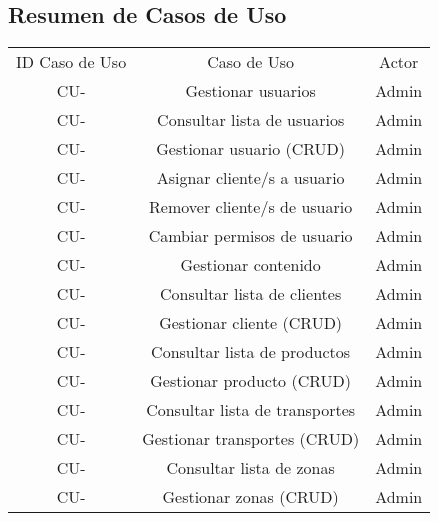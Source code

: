     \subsection{Resumen de Casos de Uso}
    \newcommand\rownumber{\stepcounter{magicrownumbers}\arabic{magicrownumbers}}
    \begin{center}
        \begin{longtable}{ |c|c|c| }
            \hline
            \rowcolor{lightgray}
            ID Caso de Uso & Caso de Uso & Actor \\
            \hhline{===}
            \endhead

            \endfoot

            CU-\rownumber & Gestionar usuarios & Admin \\ \hline
            CU-\rownumber & Consultar lista de usuarios & Admin \\ \hline
            CU-\rownumber & Gestionar usuario (CRUD) & Admin \\ \hline
            CU-\rownumber & Asignar cliente/s a usuario & Admin \\ \hline
            CU-\rownumber & Remover cliente/s de usuario & Admin \\ \hline
            CU-\rownumber & Cambiar permisos de usuario & Admin \\ \hline

            CU-\rownumber & Gestionar contenido & Admin \\ \hline
            CU-\rownumber & Consultar lista de clientes & Admin \\ \hline
            CU-\rownumber & Gestionar cliente (CRUD) & Admin \\ \hline
            CU-\rownumber & Consultar lista de productos & Admin \\ \hline
            CU-\rownumber & Gestionar producto (CRUD) & Admin \\ \hline
            CU-\rownumber & Consultar lista de transportes & Admin \\ \hline
            CU-\rownumber & Gestionar transportes (CRUD) & Admin \\ \hline
            CU-\rownumber & Consultar lista de zonas & Admin \\ \hline
            CU-\rownumber & Gestionar zonas (CRUD) & Admin \\ \hline


\end{longtable}
\end{center}
